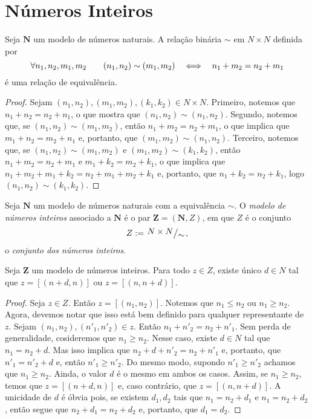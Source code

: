 \section{Números Inteiros}

\begin{prop}
	Seja $\bm N$ um modelo de números naturais. A relação binária $\sim$ em $N \times N$ definida por
	\begin{equation*}
	\forall n_1,n_2,m_1,m_2 \qquad (n_1,n_2) \sim (m_1,m_2) \quad \Longleftrightarrow \quad n_1+m_2=n_2+m_1
	\end{equation*}
é uma relação de equivalência.
\end{prop}
\begin{proof}
	Sejam $(n_1,n_2), (m_1,m_2),(k_1,k_2) \in N \times N$. Primeiro, notemos que $n_1+n_2=n_2+n_1$, o que mostra que $(n_1,n_2) \sim (n_1,n_2)$. Segundo, notemos que, se $(n_1,n_2) \sim (m_1,m_2)$, então $n_1+m_2=n_2+m_1$, o que implica que $m_1+n_2=m_2+n_1$ e, portanto, que $(m_1,m_2) \sim (n_1,n_2)$. Terceiro, notemos que, se $(n_1,n_2) \sim (m_1,m_2)$ e $(m_1,m_2) \sim (k_1,k_2)$, então $n_1+m_2=n_2+m_1$ e $m_1+k_2=m_2+k_1$, o que implica que $n_1+m_2+m_1+k_2=n_2+m_1+m_2+k_1$ e, portanto, que $n_1+k_2=n_2+k_1$, logo $(n_1,n_2) \sim (k_1,k_2)$.
\end{proof}

\begin{defi}
	Seja $\bm N$ um modelo de números naturais com a equivalência $\sim$. O \emph{modelo de números inteiros} associado a $\bm N$ é o par $\bm Z = (\bm N,Z)$, em que $Z$ é o conjunto 
	\begin{equation*}
	Z := \quo{N \times N}{\sim},
	\end{equation*}
o \emph{conjunto dos números inteiros}.
\end{defi}

\begin{prop}
	Seja $\bm Z$ um modelo de números inteiros. Para todo $z \in Z$, existe único $d \in N$ tal que $z=[(n+d,n)]$ ou $z=[(n,n+d)]$.
\end{prop}
\begin{proof}
	Seja $z \in Z$. Então $z=[(n_1,n_2)]$. Notemos que $n_1 \leq n_2$ ou $n_1 \geq n_2$. Agora, devemos notar que isso está bem definido para qualquer representante de $z$. Sejam $(n_1,n_2),(n'_1,n'_2) \in z$. Então $n_1+n'_2=n_2+n'_1$. Sem perda de generalidade, cosideremos que $n_1 \geq n_2$. Nesse caso, existe $d \in N$ tal que $n_1=n_2+d$. Mas isso implica que $n_2+d+n'_2=n_2+n'_1$ e, portanto, que $n'_1=n'_2+d$ e, então $n'_1 \geq n'_2$. Do mesmo modo, supondo $n'_1 \geq n'_2$ achamos que $n_1 \geq n_2$. Ainda, o valor $d$ é o mesmo em ambos os casos. Assim, se $n_1 \geq n_2$, temos que $z=[(n+d,n)]$ e, caso contrário, que $z=[(n,n+d)]$. A unicidade de $d$ é óbvia pois, se existem $d_1,d_2$ tais que $n_1=n_2+d_1$ e $n_1=n_2+d_2$, então segue que $n_2+d_1=n_2+d_2$ e, portanto, que $d_1=d_2$.
\end{proof}

